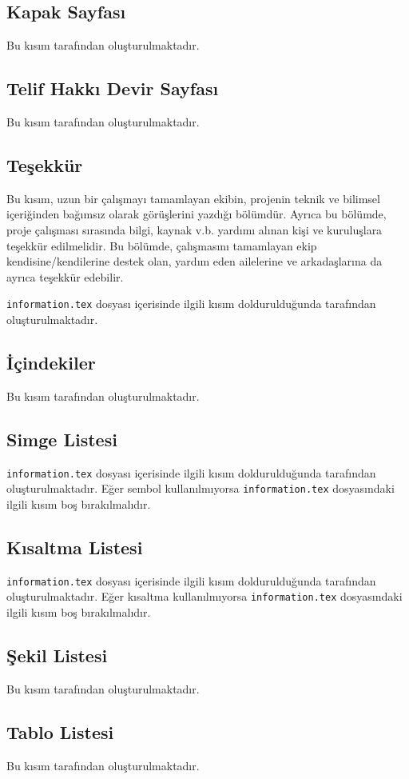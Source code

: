 \subsection{Kapak Sayfası}
Bu kısım \latex tarafından oluşturulmaktadır.
\subsection{Telif Hakkı Devir Sayfası}
Bu kısım \latex tarafından oluşturulmaktadır.
\subsection{Teşekkür} 
Bu kısım, uzun bir çalışmayı tamamlayan ekibin, projenin teknik ve bilimsel içeriğinden bağımsız olarak görüşlerini yazdığı bölümdür. Ayrıca bu bölümde, proje çalışması sırasında bilgi, kaynak v.b. yardımı alınan kişi ve kuruluşlara teşekkür edilmelidir. Bu bölümde, çalışmasını tamamlayan ekip kendisine/kendilerine destek olan, yardım eden ailelerine ve arkadaşlarına da ayrıca teşekkür edebilir.

\texttt{information.tex} dosyası içerisinde ilgili kısım doldurulduğunda \latex tarafından oluşturulmaktadır.

\subsection{İçindekiler}
Bu kısım \latex tarafından oluşturulmaktadır.
\subsection{Simge Listesi}
\texttt{information.tex} dosyası içerisinde ilgili kısım doldurulduğunda \latex tarafından oluşturulmaktadır. Eğer sembol kullanılmıyorsa \texttt{information.tex} dosyasındaki ilgili kısım boş bırakılmalıdır.

\subsection{Kısaltma Listesi}
\texttt{information.tex} dosyası içerisinde ilgili kısım doldurulduğunda \latex tarafından oluşturulmaktadır. Eğer kısaltma kullanılmıyorsa \texttt{information.tex} dosyasındaki ilgili kısım boş bırakılmalıdır.

\subsection{Şekil Listesi}
Bu kısım \latex tarafından oluşturulmaktadır.
\subsection{Tablo Listesi}
Bu kısım \latex tarafından oluşturulmaktadır.

